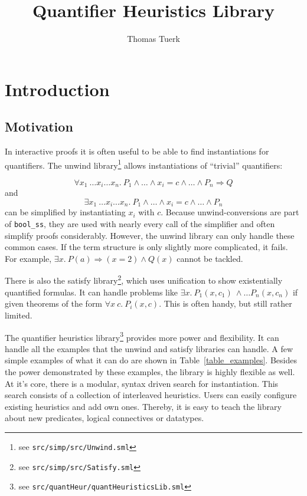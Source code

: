 \documentclass[a4paper,12pt,DIV=12,oneside]{scrbook}
\theoremstyle{definition}
\theoremstyle{remark}
\begin{document}
\title{Quantifier Heuristics Library}
\author{Thomas Tuerk}

\maketitle

\tableofcontents

\chapter{Introduction}
\section{Motivation}
\label{sec_motivation}

In interactive proofs it is often useful to be able to find instantiations
for quantifiers. The unwind library\footnote{see \texttt{src/simp/src/Unwind.sml}} allows
instantiations of ``trivial'' quantifiers:

\[ \forall x_1\ \ldots x_i \ldots x_n.\ P_1 \wedge \ldots \wedge x_i = c \wedge \ldots \wedge P_n \Longrightarrow Q \]
and
\[ \exists x_1\ \ldots x_i \ldots x_n.\ P_1 \wedge \ldots \wedge x_i =
c \wedge \ldots \wedge P_n \] can be simplified by
instantiating $x_i$ with $c$. Because unwind-conversions are 
part of \texttt{bool\_ss}, they are used with nearly every call of the simplifier
and often simplify proofs considerably. However, the unwind library can only handle these common cases. If the term structure is
only slightly more complicated, it fails. For example, $\exists x.\ P(a) \Longrightarrow (x = 2) \wedge Q(x)$
cannot be tackled.

There is also the satisfy library\footnote{see \texttt{src/simp/src/Satisfy.sml}}, which uses unification to 
show existentially quantified formulas. It can handle problems like
$\exists x.\ P_1(x,c_1)\ \wedge \ldots P_n(x,c_n)$ if given
theorems of the form $\forall x\ c.\ P_i(x, c)$. This is often handy, but still rather limited.

The quantifier heuristics library\footnote{see
  \texttt{src/quantHeur/quantHeuristicsLib.sml}} provides more power
and flexibility.  It can handle all the examples that the unwind and
satisfy libraries can handle. A few simple examples of what it can do
are shown in Table~\ref{table_examples}. Besides the power demonstrated
by these examples, the library is highly flexible as well.  At it's
core, there is a modular, syntax driven search for instantiation.
This search consists of a collection of interleaved heuristics.  Users
can easily configure existing heuristics and add own ones. Thereby, it
is easy to teach the library about new predicates, logical connectives
or datatypes.
\end{document}
